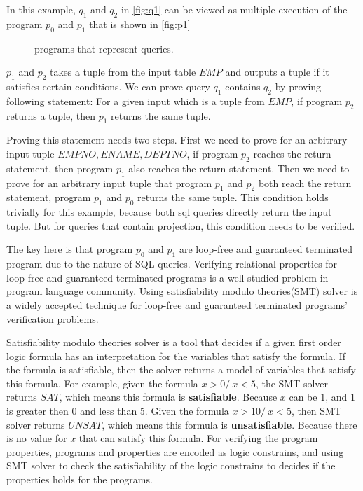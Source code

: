 %
In this example, $q_1$ and $q_2$ in \autoref{fig:q1} can be viewed as multiple execution of the program 
$p_0$ and $p_1$ that is shown in \autoref{fig:p1}
%
\begin{figure}

\caption{%
    programs that represent queries.
  }\label{fig:p1}
\end{figure}
%
$p_1$ and $p_2$ takes a tuple from the input table $EMP$ and outputs a tuple if it satisfies certain conditions.
%
We can prove query $q_1$ contains $q_2$ by proving following statement:
For a given input which is a tuple from $EMP$, if program $p_2$ returns a tuple, 
then $p_1$ returns the same tuple.

%
Proving this statement needs two steps.
%
First we need to prove for an arbitrary input tuple $EMPNO,ENAME,DEPTNO$, if program $p_2$ 
reaches the return statement, then program $p_1$ also reaches the return statement.
%
Then we need to prove for an arbitrary input tuple that program $p_1$ and $p_2$ both reach the return statement, 
program $p_1$ and $p_0$ returns the same tuple.
%
This condition holds trivially for this example, because both sql queries directly return the input tuple.
%
But for queries that contain projection, this condition needs to be verified.

The key here is that program $p_0$ and $p_1$ are loop-free and guaranteed terminated program due to the nature of
SQL queries.
%
Verifying relational properties for loop-free and guaranteed terminated programs is 
a well-studied problem in program language community.
%
Using satisfiability modulo theories(SMT) solver is a widely accepted technique for loop-free and guaranteed
terminated programs' verification problems.
%

Satisfiability modulo theories solver is a tool that decides if a given first order logic formula has an
interpretation for the variables that satisfy the formula.
%
If the formula is satisfiable, then the solver returns a model of variables that satisfy this formula.
%
For example, given the formula $x>0 /\ x < 5$, the SMT solver returns $SAT$, which means this formula is 
\textbf{satisfiable}.
%
Because $x$ can be $1$, and $1$ is greater then 0 and less than 5.
%
Given the formula $x > 10 /\ x < 5$, then SMT solver returns $UNSAT$, which means this formula is 
\textbf{unsatisfiable}.
%
Because there is no value for $x$ that can satisfy this formula.
%
For verifying the program properties, programs and properties are encoded as logic constrains, and using SMT
solver to check the satisfiability of the logic constrains to decides if the properties holds for the programs.

